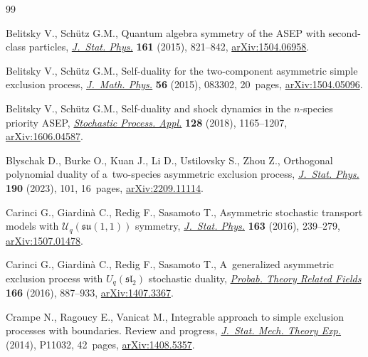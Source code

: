\begin{thebibliography}{99}
\footnotesize\itemsep=0pt

Belitsky V., Sch\"utz G.M., Quantum algebra symmetry of the {ASEP} with
 second-class particles,
 \href{https://doi.org/10.1007/s10955-015-1363-1}{\textit{J.~Stat. Phys.}}
 \textbf{161} (2015), 821--842,
 \href{https://arxiv.org/abs/1504.06958}{arXiv:1504.06958}.

Belitsky V., Sch\"utz G.M., Self-duality for the two-component asymmetric
 simple exclusion process,
 \href{https://doi.org/10.1063/1.4929663}{\textit{J.~Math. Phys.}} \textbf{56}
 (2015), 083302, 20~pages,
 \href{https://arxiv.org/abs/1504.05096}{arXiv:1504.05096}.

Belitsky V., Sch\"utz G.M., Self-duality and shock dynamics in the
 {$n$}-species priority {ASEP},
 \href{https://doi.org/10.1016/j.spa.2017.07.003}{\textit{Stochastic Process.
 Appl.}} \textbf{128} (2018), 1165--1207,
 \href{https://arxiv.org/abs/1606.04587}{arXiv:1606.04587}.

Blyschak D., Burke O., Kuan J., Li D., Ustilovsky S., Zhou Z., Orthogonal
 polynomial duality of a~two-species asymmetric exclusion process,
 \href{https://doi.org/10.1007/s10955-023-03100-y}{\textit{J.~Stat. Phys.}}
 \textbf{190} (2023), 101, 16~pages,
 \href{https://arxiv.org/abs/2209.11114}{arXiv:2209.11114}.

Carinci G., Giardin\`a C., Redig F., Sasamoto T., Asymmetric stochastic
 transport models with {$\mathcal{U}_q(\mathfrak{su}(1,1))$} symmetry,
 \href{https://doi.org/10.1007/s10955-016-1473-4}{\textit{J.~Stat. Phys.}}
 \textbf{163} (2016), 239--279,
 \href{https://arxiv.org/abs/1507.01478}{arXiv:1507.01478}.

Carinci G., Giardin\`a C., Redig F., Sasamoto T., A~generalized asymmetric
 exclusion process with {$U_q(\mathfrak{sl}_2)$} stochastic duality,
 \href{https://doi.org/10.1007/s00440-015-0674-0}{\textit{Probab. Theory
 Related Fields}} \textbf{166} (2016), 887--933,
 \href{https://arxiv.org/abs/1407.3367}{arXiv:1407.3367}.

Crampe N., Ragoucy E., Vanicat M., Integrable approach to simple exclusion
 processes with boundaries. {R}eview and progress,
 \href{https://doi.org/10.1088/1742-5468/2014/11/p11032}{\textit{J.~Stat.
 Mech. Theory Exp.}} (2014), P11032, 42~pages,
 \href{https://arxiv.org/abs/1408.5357}{arXiv:1408.5357}.


\end{thebibliography}
